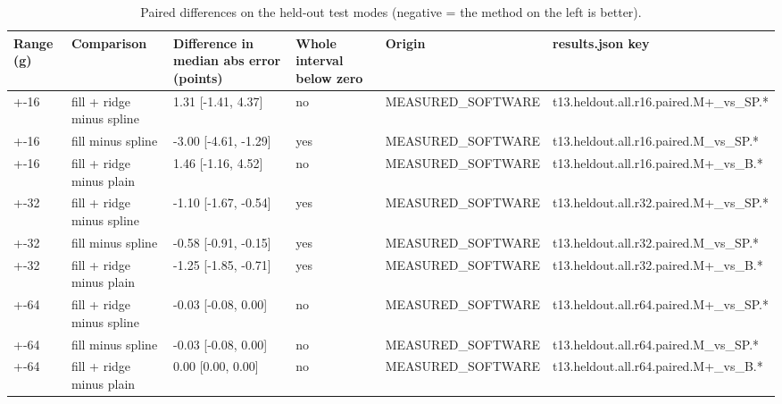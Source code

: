 \begin{table}[t]
\centering
\small
\caption{Paired differences on the held-out test modes (negative = the method on the left is better).}
\label{tab:jp_tab_t13_paired}
\begin{tabular}{llllll}
\toprule
Range (g) & Comparison & Difference in median abs error (points) & Whole interval below zero & Origin & results.json key \\
\midrule
+-16 & fill + ridge minus spline & 1.31 [-1.41, 4.37] & no & MEASURED\_SOFTWARE & t13.heldout.all.r16.paired.M+\_vs\_SP.* \\
+-16 & fill minus spline & -3.00 [-4.61, -1.29] & yes & MEASURED\_SOFTWARE & t13.heldout.all.r16.paired.M\_vs\_SP.* \\
+-16 & fill + ridge minus plain & 1.46 [-1.16, 4.52] & no & MEASURED\_SOFTWARE & t13.heldout.all.r16.paired.M+\_vs\_B.* \\
+-32 & fill + ridge minus spline & -1.10 [-1.67, -0.54] & yes & MEASURED\_SOFTWARE & t13.heldout.all.r32.paired.M+\_vs\_SP.* \\
+-32 & fill minus spline & -0.58 [-0.91, -0.15] & yes & MEASURED\_SOFTWARE & t13.heldout.all.r32.paired.M\_vs\_SP.* \\
+-32 & fill + ridge minus plain & -1.25 [-1.85, -0.71] & yes & MEASURED\_SOFTWARE & t13.heldout.all.r32.paired.M+\_vs\_B.* \\
+-64 & fill + ridge minus spline & -0.03 [-0.08, 0.00] & no & MEASURED\_SOFTWARE & t13.heldout.all.r64.paired.M+\_vs\_SP.* \\
+-64 & fill minus spline & -0.03 [-0.08, 0.00] & no & MEASURED\_SOFTWARE & t13.heldout.all.r64.paired.M\_vs\_SP.* \\
+-64 & fill + ridge minus plain & 0.00 [0.00, 0.00] & no & MEASURED\_SOFTWARE & t13.heldout.all.r64.paired.M+\_vs\_B.* \\
\bottomrule
\end{tabular}
\end{table}

